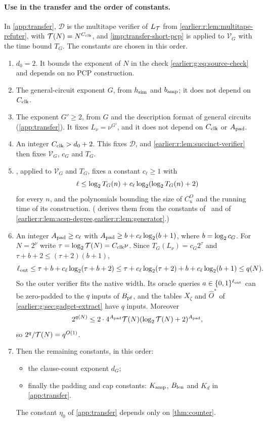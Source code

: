 \paragraph{Use in the transfer and the order of constants.} In
\cref{app:transfer}, \(\mathcal D\) is the
multitape verifier of \(L_{\mathcal T}\) from \cref{earlier:r:lem:multitape-refuter},
with \(\mathcal T(N)=N^{C_{\rm clk}}\), and \cref{imp:transfer-short-pcp} is applied to
\(\mathcal V_G\) with the time bound \(T_G\). The constants are chosen
in this order.
\begin{enumerate}
\item \(d_0=2\). It
bounds the exponent of \(N\) in the check \eqref{earlier:g:eq:source-check} and
depends on no PCP construction.
\item The general-circuit exponent \(G\), from \(h_{\rm sim}\) and
\(b_{\rm amp}\); it does not depend on \(C_{\rm clk}\).
\item The exponent \(G'\ge2\), from \(G\) and the description format of
general circuits (\cref{app:transfer}). It fixes
\(L_\nu=\nu^{G'}\), and it does not depend on \(C_{\rm clk}\) or
\(A_{\rm pad}\).
\item An integer \(C_{\rm clk}>d_0+2\). This fixes \(\mathcal D\), and
\cref{earlier:r:lem:succinct-verifier} then fixes \(\mathcal V_G\), \(c_G\) and
\(T_G\).
\item {}, applied to \(\mathcal V_G\) and \(T_G\), fixes
a constant \(c_\ell\ge1\) with
\[
 \ell\le\log_2 T_G(n)+c_\ell\log_2(\log_2 T_G(n)+2)
\]
for every \(n\), and the polynomials bounding the size of \(C^O_u\) and
the running time of its construction. ( derives
them from the constants of~\cite{BCGT13} and of
\cref{earlier:r:lem:acsp-degree,earlier:r:lem:generator}.)
\item An integer \(A_{\rm pad}\ge c_\ell\) with
\(A_{\rm pad}\ge b+c_\ell\log_2(b+1)\), where \(b=\log_2 c_G\). For
\(N=2^\nu\) write \(\tau=\log_2\mathcal T(N)=C_{\rm clk}\nu\). Since
\(T_G(L_\nu)=c_G2^\tau\) and \(\tau+b+2\le(\tau+2)(b+1)\),
\[
 \ell_{\rm out}\le\tau+b+c_\ell\log_2(\tau+b+2)
 \le\tau+c_\ell\log_2(\tau+2)+b+c_\ell\log_2(b+1)\le q(N).
\]
So the outer verifier fits the native width. Its oracle queries
\(a\in\{0,1\}^{\ell_{\rm out}}\) can be zero-padded to the \(q\)
inputs of \(B_{\rm pf}\), and the tables \(X_\zeta\) and
\(\widehat O^*\) of \cref{earlier:g:sec:gadget-extract} have
\(q\) inputs. Moreover
\[
 2^{q(N)}\le2\cdot4^{A_{\rm pad}}\mathcal T(N)(\log_2\mathcal T(N)+2)^{A_{\rm pad}},
\]
so \(2^q/\mathcal T(N)=q^{O(1)}\).
\item Then the remaining constants, in this order:
\begin{itemize}
\item the clause-count exponent \(d_G\);
\item finally the padding and cap constants: \(K_{\rm amp}\),
\(B_{\rm len}\) and \(K_d\) in
\cref{app:transfer}.
\end{itemize}
The constant \(\eta_0\) of \cref{app:transfer} depends only on
\cref{thm:counter}.
\end{enumerate}
